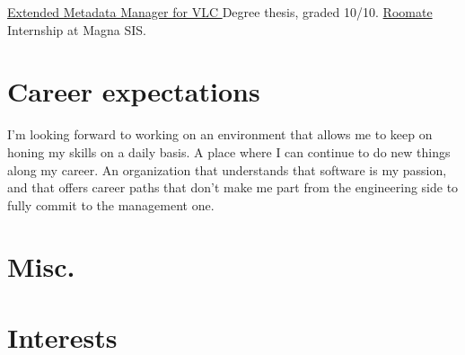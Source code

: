 \documentclass[letterpaper]{twentysecondcv} %
\begin{document}
\begin{twenty} %
    	{\href{https://github.com/ASantosVal/EMM_for_VLC}
    	{Extended Metadata Manager for VLC \faExternalLink} }
    	{}
    	{Degree thesis, graded 10/10.}
    	{\href{https://roomate-magnarenove.herokuapp.com/}
    	{Roomate \faExternalLink} }
    	{}
    	{Internship at Magna SIS.}
\end{twenty}


\section{Career expectations}

I'm looking forward to working on an environment that allows me to keep on honing my skills on a daily basis. A place where I can continue to do new things along my career. An organization that understands that software is my passion, and that offers career paths that don't make me part from the engineering side to fully commit to the management one.


\section{Misc.}

\begin{customList} %
\end{customList}


\section{Interests}
\end{document}
